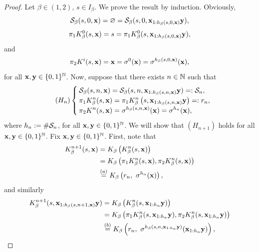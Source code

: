 \begin{proof}
    Let $\beta \in (1,2)$, $s \in I_\beta$. We prove the result by induction. Obviously,
    \begin{equation}
        \mathcal{S}_\beta(s,0,{\bf x}) = \varnothing = \mathcal{S}_\beta(s,0,{\bf x}_{1:h_\beta(s,0,{\bf x})}{\bf y}),
    \end{equation}
    \begin{equation}
        \pi_1 K^0_\beta(s,{\bf x}) = s =  \pi_1 K^0_\beta(s,{\bf x}_{1:h_\beta(s,0,{\bf x})}{\bf y}),
    \end{equation}
    and
    \begin{equation}
        \pi_2 K^i(s,{\bf x}) = {\bf x} = \sigma^{0}({\bf x}) = \sigma^{h_\beta(s,0,{\bf x})}({\bf x}),
    \end{equation}
    for all ${\bf x},{\bf y} \in \{0,1\}^{\mathbb{N}}$.
    Now, suppose that there exists $n \in \mathbb{N}$ such that
    \begin{equation}\tag{$H_n$}
        \begin{cases}
            \mathcal{S}_\beta(s,n,{\bf x}) = \mathcal{S}_\beta(s,n,{\bf x}_{1:h_\beta(s,n,{\bf x})}{\bf y}) =: \mathcal{S}_n,\\
            \displaystyle \pi_1 K^n_\beta(s,{\bf x}) = \pi_1 K^n_\beta\left(s,{\bf x}_{1:h_\beta(s,n,{\bf x})}{\bf y}\right) =: r_n,\\
            \displaystyle \pi_2 K^n(s,{\bf x}) = \sigma^{h_\beta(s,n,{\bf x})}({\bf x}) = \sigma^{h_n}({\bf x}),
        \end{cases}
    \end{equation}
    where $h_n := \# \mathcal{S}_n$, for all ${\bf x}, {\bf y} \in \{0,1\}^{\mathbb{N}}$. We will show that $(H_{n+1})$ holds for all ${\bf x}, {\bf y} \in \{0,1\}^{\mathbb{N}}$. Fix ${\bf x}, {\bf y} \in \{0,1\}^{\mathbb{N}}$. First, note that 
    \begin{align}
        K^{n+1}_\beta(s,\xf) &= K_\beta \left( K^n_\beta(s,\xf)\right)\\
        &= K_\beta\left( \pi_1 K^n_\beta(s,\xf), \pi_2 K^n_\beta(s,\xf)\right)\\
        &\overset{(a)}{=} K_\beta\left( r_n, \ \sigma^{h_n}(\xf)\right),
    \end{align}
    and similarly
    \begin{align}
        K^{n+1}_\beta(s,\xf_{1:h_\beta(s,n+1,\xf)}\yf) &= K_\beta \left( K^n_\beta(s,\xf_{1:h_n}\yf)\right)\\
        &= K_\beta\left( \pi_1 K^n_\beta(s,\xf_{1:h_n}\yf), \pi_2 K^n_\beta(s,\xf_{1:h_n}\yf)\right)\\
        &\overset{(b)}{=} K_\beta\left(r_n, \ \sigma^{h_\beta(s,n,\xf_{1:h_n}\yf)}(\xf_{1:h_n}\yf)\right),\\

\end{align}
\end{proof}
